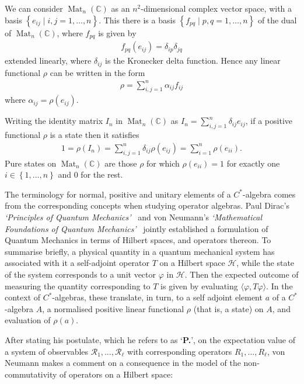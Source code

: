 \documentclass[11pt,a4paper]{report}
\theoremstyle{plain}
\theoremstyle{definition}
\newcommand{\1}{\mathbbm{1}}
\newcommand{\C}{\mathbb{C}}
\renewcommand{\H}{\mathcal{H}}
\renewcommand{\phi}{\varphi}
\DeclareMathOperator{\Mat}{\operatorname{Mat}}
\begin{document}
We can consider $\Mat_n(\C)$ as an $n^2$-dimensional complex vector space, with 
a basis $\left\{e_{ij} \mid i,j =1,\dots,n\right\}$. This there is a basis 
$\left\{f_{pq} \mid p,q =1,\dots,n\right\}$ of the dual of $\Mat_n(\C)$, where 
$f_{pq}$ is given by 
\begin{align*}
	f_{pq}(e_{ij}) = \delta_{ip}\delta_{jq}
\end{align*}
extended linearly, where $\delta_{ij}$ is the Kronecker delta function. Hence 
any linear functional $\rho$ can be written in the form
\begin{align*}
	\rho = \sum_{i,j=1}^n \alpha_{ij}f_{ij}
\end{align*}
where $\alpha_{ij}=\rho(e_{ij})$.

Writing the identity matrix $I_n$ in $\Mat_n(\C)$ as $I_n =
\sum_{i,j=1}^n\delta_{ij}e_{ij}$, if a positive functional $\rho$ is a state then it 
satisfies
\begin{align*}
	1 = \rho(I_n) = \sum_{i,j=1}^n\delta_{ij}\rho(e_{ij}) = \sum_{i=1}^n\rho(e_{ii}).
\end{align*}
Pure states on $\Mat_n(\C)$ are those $\rho$ for which $\rho(e_{ii})=1$ for 
exactly one $i \in \left\{1,\dots,n\right\}$ and $0$ for the rest.




The terminology for normal, positive and unitary elements of a $C^\ast$-algebra 
comes from the corresponding concepts when studying operator algebras. 
Paul Dirac's \emph{`Principles of Quantum Mechanics'}~\cite{dirac} and von 
Neumann's \emph{`Mathematical Foundations of Quantum Mechanics'}~\cite{vonneumann32} 
jointly established a formulation of Quantum Mechanics in 
terms of Hilbert spaces, and operators thereon. To summarise briefly, a physical 
quantity in a quantum mechanical system has associated with it a self-adjoint 
operator $T$ on a Hilbert space $\H$,  while the state of the system corresponds 
to a unit vector $\phi$ in $\H$. Then the expected outcome of measuring the 
quantity corresponding to $T$ is given by evaluating $\langle\phi, 
T\phi\rangle$. In the context of $C^\ast$-algebras, these translate, in turn, to 
a self adjoint element $a$ of a $C^\ast$-algebra $A$, a normalised positive 
linear functional $\rho$ (that is, a state) on $A$, and evaluation of $\rho(a)$.


After stating his postulate, which he refers to as `\textbf{P.}', on the 
expectation value of a system of observables 
$\mathscr{R_1},\dots,\mathscr{R_\ell}$ with corresponding operators $R_1,\dots, 
R_\ell$, von Neumann makes a comment on a consequence in the model of the 
non-commutativity of operators on a Hilbert space:
\end{document}
